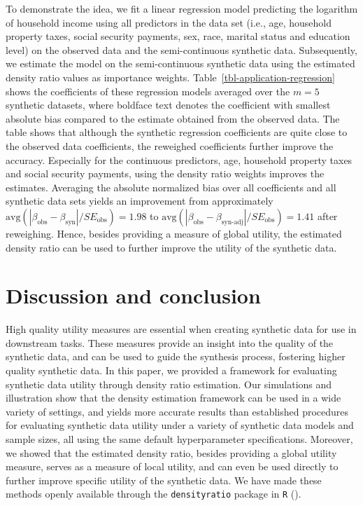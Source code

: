 \documentclass[
]{article}
\begin{document}
To demonstrate the idea, we fit a linear regression model predicting the
logarithm of household income using all predictors in the data set
(i.e., age, household property taxes, social security payments, sex,
race, marital status and education level) on the observed data and the
semi-continuous synthetic data. Subsequently, we estimate the model on
the semi-continuous synthetic data using the estimated density ratio
values as importance weights. Table~\ref{tbl-application-regression}
shows the coefficients of these regression models averaged over the
\(m=5\) synthetic datasets, where boldface text denotes the coefficient
with smallest absolute bias compared to the estimate obtained from the
observed data. The table shows that although the synthetic regression
coefficients are quite close to the observed data coefficients, the
reweighed coefficients further improve the accuracy. Especially for the
continuous predictors, age, household property taxes and social security
payments, using the density ratio weights improves the estimates.
Averaging the absolute normalized bias over all coefficients and all
synthetic data sets yields an improvement from approximately
\(\text{avg}(|\beta_\text{obs}-\beta_\text{syn}|/SE_\text{obs}) = 1.98\)
to
\(\text{avg}(|\beta_\text{obs}-\beta_\text{syn-adj}|/SE_\text{obs}) = 1.41\)
after reweighing. Hence, besides providing a measure of global utility,
the estimated density ratio can be used to further improve the utility
of the synthetic data.

\section{Discussion and conclusion}\label{discussion-and-conclusion}

High quality utility measures are essential when creating synthetic data
for use in downstream tasks. These measures provide an insight into the
quality of the synthetic data, and can be used to guide the synthesis
process, fostering higher quality synthetic data. In this paper, we
provided a framework for evaluating synthetic data utility through
density ratio estimation. Our simulations and illustration show that the
density estimation framework can be used in a wide variety of settings,
and yields more accurate results than established procedures for
evaluating synthetic data utility under a variety of synthetic data
models and sample sizes, all using the same default hyperparameter
specifications. Moreover, we showed that the estimated density ratio,
besides providing a global utility measure, serves as a measure of local
utility, and can even be used directly to further improve specific
utility of the synthetic data. We have made these methods openly
available through the \texttt{densityratio} package in \texttt{R}
().
\end{document}
